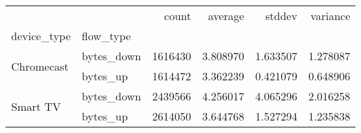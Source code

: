 \begin{tabular}{llrrrr}
\toprule
 &  & count & average & stddev & variance \\
device_type & flow_type &  &  &  &  \\
\midrule
\multirow[t]{2}{*}{Chromecast} & bytes\_down & 1616430 & 3.808970 & 1.633507 & 1.278087 \\
 & bytes\_up & 1614472 & 3.362239 & 0.421079 & 0.648906 \\
\cline{1-6}
\multirow[t]{2}{*}{Smart TV} & bytes\_down & 2439566 & 4.256017 & 4.065296 & 2.016258 \\
 & bytes\_up & 2614050 & 3.644768 & 1.527294 & 1.235838 \\
\cline{1-6}
\bottomrule
\end{tabular}

